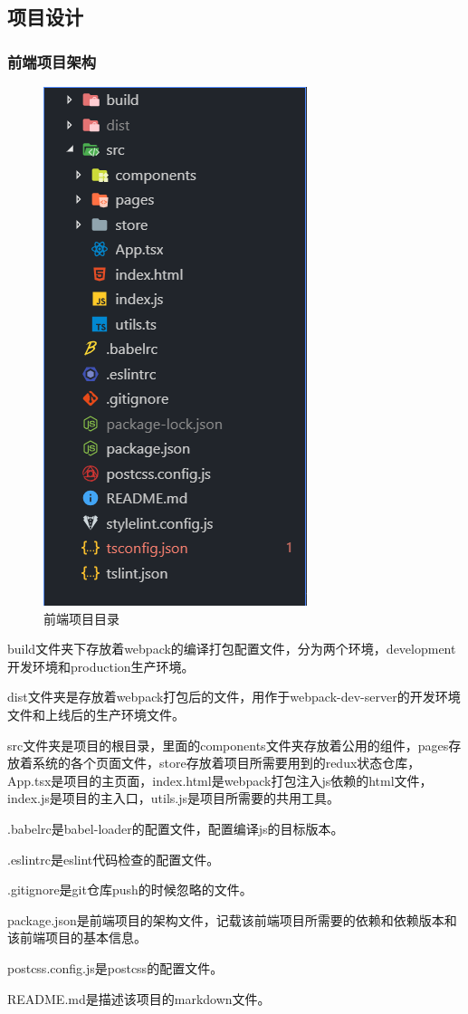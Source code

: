 \subsection{项目设计}

\subsubsection{前端项目架构}

\begin{figure}[thbp!]
	\centering
	\includegraphics[width=0.3\linewidth]{figure/frontend_structure}
	\caption{前端项目目录}
	\label{fig:frontend_structure}
\end{figure}

build文件夹下存放着webpack的编译打包配置文件，分为两个环境，development开发环境和production生产环境。

dist文件夹是存放着webpack打包后的文件，用作于webpack-dev-server的开发环境文件和上线后的生产环境文件。

src文件夹是项目的根目录，里面的components文件夹存放着公用的组件，pages存放着系统的各个页面文件，store存放着项目所需要用到的redux状态仓库，App.tsx是项目的主页面，index.html是webpack打包注入js依赖的html文件，index.js是项目的主入口，utils.js是项目所需要的共用工具。

.babelrc是babel-loader的配置文件，配置编译js的目标版本。

.eslintrc是eslint代码检查的配置文件。

.gitignore是git仓库push的时候忽略的文件。

package.json是前端项目的架构文件，记载该前端项目所需要的依赖和依赖版本和该前端项目的基本信息。

postcss.config.js是postcss的配置文件。

README.md是描述该项目的markdown文件。

